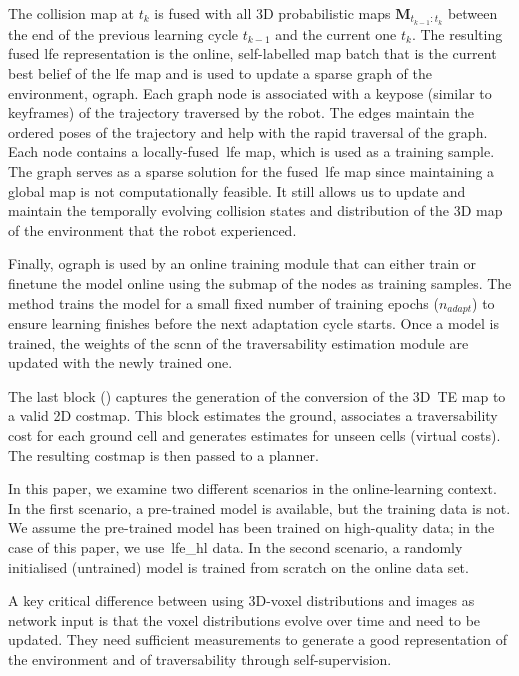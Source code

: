 The collision map at $t_k$ is fused with all 3D probabilistic maps $\mathbf{M}_{t_{k-1}:t_{k}}$ between the end of the previous learning cycle $t_{k-1}$ and the current one $t_k$. The resulting fused \ac{lfe} representation is the online, self-labelled map batch that is the current best belief of the \ac{lfe} map and is used to update a sparse graph of the environment, \ac{ograph}. Each graph node is associated with a keypose (similar to keyframes) of the trajectory traversed by the robot. The edges maintain the ordered poses of the trajectory and help with the rapid traversal of the graph. Each node contains a locally-fused~\ac{lfe} map, which is used as a training sample. The graph serves as a sparse solution for the fused~\ac{lfe} map since maintaining a global map is not computationally feasible. It still allows us to update and maintain the temporally evolving collision states and distribution of the 3D map of the environment that the robot experienced.

Finally, \ac{ograph} is used by an online training module that can either train or finetune the model online using the submap of the nodes as training samples. The method trains the model for a small fixed number of training epochs ($n_{adapt}$) to ensure learning finishes before the next adaptation cycle starts. Once a model is trained, the weights of the \ac{scnn} of the traversability estimation module are updated with the newly trained one.

The last block () captures the generation of the conversion of the 3D~\ac{TE} map to a valid 2D costmap. This block estimates the ground, associates a traversability cost for each ground cell and generates estimates for unseen cells (virtual costs). The resulting costmap is then passed to a planner.

In this paper, we examine two different scenarios in the online-learning context. In the first scenario, a pre-trained model is available, but the training data is not. We assume the pre-trained model has been trained on high-quality data; in the case of this paper, we use~\ac{lfe_hl} data. In the second scenario, a randomly initialised (untrained) model is trained from scratch on the online data set. 

A key critical difference between using 3D-voxel distributions and images as network input is that the voxel distributions evolve over time and need to be updated. They need sufficient measurements to generate a good representation of the environment and of traversability through self-supervision. 

